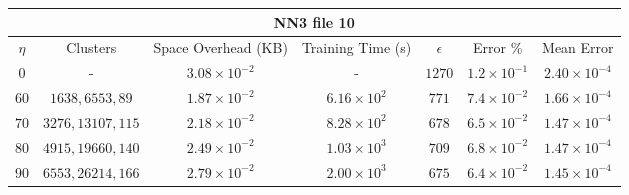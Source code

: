 \par\null\par
\par\null\par

\begin{adjustwidth}{-1.5cm}{}
\begin{tabular}{ccccccc}
\hline
\multicolumn{7}{c}{NN3 file 10} \\
\toprule
$\eta$ & Clusters & Space Overhead (KB) & Training Time (s) & $\epsilon$ & Error \% & Mean Error\\
\midrule
$0$  & - & $3.08 \times 10^{-2}$ & - & $1270$ & $1.2 \times 10^{-1}$ & $2.40 \times 10^{-4}$\\
$60$ & $1638, 6553, 89$ & $1.87 \times 10^{-2}$ & $6.16 \times 10^2$ & $771$ & $7.4 \times 10^{-2}$ & $1.66 \times 10^{-4}$\\
$70$ & $3276, 13107, 115$ & $2.18 \times 10^{-2}$ & $8.28 \times 10^2$ & $678$ & $6.5 \times 10^{-2}$ & $1.47 \times 10^{-4}$\\
$80$ & $4915, 19660, 140$ & $2.49 \times 10^{-2}$ & $1.03 \times 10^3$ & $709$ & $6.8 \times 10^{-2}$ & $1.47 \times 10^{-4}$\\
$90$ & $6553, 26214, 166$ & $2.79 \times 10^{-2}$ & $2.00 \times 10^3$ & $675$ & $6.4 \times 10^{-2}$ & $1.45 \times 10^{-4}$\\
\bottomrule
\end{tabular}
\end{adjustwidth}

\par\null\par
\par\null\par